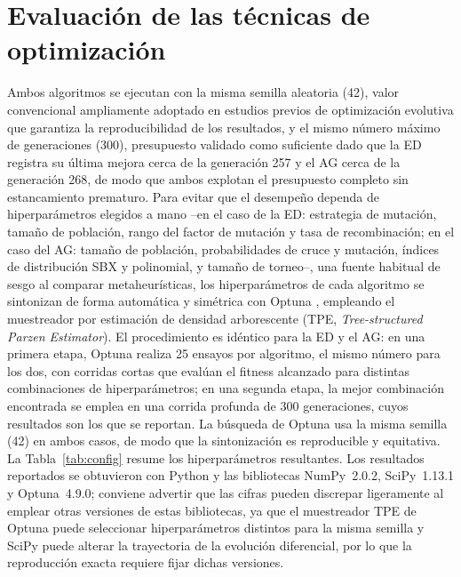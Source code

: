 \documentclass[conference]{IEEEtran}
\begin{document}
\section{Evaluación de las técnicas de optimización}
Ambos algoritmos se ejecutan con la misma semilla aleatoria (42), valor
convencional ampliamente adoptado en estudios previos de optimización evolutiva
que garantiza la reproducibilidad de los resultados, y el mismo número máximo de
generaciones (300), presupuesto validado como suficiente dado que la ED registra
su última mejora cerca de la generación 257 y el AG cerca de la generación 268,
de modo que ambos explotan el presupuesto completo sin estancamiento prematuro.
Para evitar que el desempeño dependa de hiperparámetros elegidos a mano
--en el caso de la ED: estrategia de mutación, tamaño de población, rango del
factor de mutación y tasa de recombinación; en el caso del AG: tamaño de
población, probabilidades de cruce y mutación, índices de distribución SBX y
polinomial, y tamaño de torneo--, una fuente habitual de sesgo al comparar
metaheurísticas, los hiperparámetros de cada algoritmo se sintonizan de forma
automática y simétrica con Optuna \cite{ref_optuna}, empleando el muestreador por
estimación de densidad arborescente (TPE, \emph{Tree-structured Parzen
Estimator}). El procedimiento es idéntico para la ED y el AG: en una primera
etapa, Optuna realiza 25 ensayos por algoritmo, el mismo número para los dos, con
corridas cortas que evalúan el fitness alcanzado para distintas combinaciones de
hiperparámetros; en una segunda etapa, la mejor combinación encontrada se emplea
en una corrida profunda de 300 generaciones, cuyos resultados son los que se
reportan. La búsqueda de Optuna usa la misma semilla (42) en ambos casos, de modo
que la sintonización es reproducible y equitativa. La Tabla~\ref{tab:config}
resume los hiperparámetros resultantes. Los resultados reportados se obtuvieron
con Python y las bibliotecas NumPy~2.0.2, SciPy~1.13.1 y Optuna~4.9.0; conviene
advertir que las cifras pueden discrepar ligeramente al emplear otras versiones
de estas bibliotecas, ya que el muestreador TPE de Optuna puede seleccionar
hiperparámetros distintos para la misma semilla y SciPy puede alterar la
trayectoria de la evolución diferencial, por lo que la reproducción exacta
requiere fijar dichas versiones.
\end{document}

